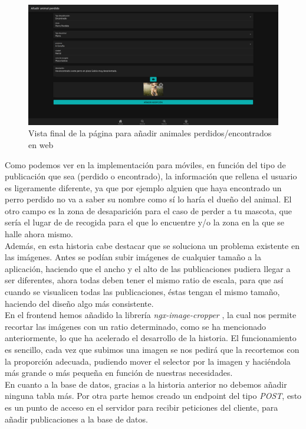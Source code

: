 \begin{figure}[H]
	\centering
	\includegraphics[width=0.8\linewidth]{"sprint 2/hu4/impPerdidosWeb"}
	\caption{Vista final de la página para añadir animales perdidos/encontrados en web}
	\label{fig:impperdidosweb}
\end{figure}

Como podemos ver en la implementación para móviles, en función del tipo de publicación que sea (perdido o encontrado), la información que rellena el usuario es ligeramente diferente, ya que por ejemplo alguien que haya encontrado un perro perdido no va a saber su nombre como sí lo haría el dueño del animal. El otro campo es la zona de desaparición para el caso de perder a tu mascota, que sería el lugar de de recogida para el que lo encuentre y/o la zona en la que se halle ahora mismo. \\

Además, en esta historia cabe destacar que se soluciona un problema existente en las imágenes. Antes se podían subir imágenes de cualquier tamaño a la aplicación, haciendo que el ancho y el alto de las publicaciones pudiera llegar a ser diferentes, ahora todas deben tener el mismo ratio de escala, para que así cuando se visualicen todas las publicaciones, éstas tengan el mismo tamaño, haciendo del diseño algo más consistente.\\

En el frontend hemos añadido la librería \textit{ngx-image-cropper} \cite{cropper}, la cual nos permite recortar las imágenes con un ratio determinado, como se ha mencionado anteriormente, lo que ha acelerado el desarrollo de la historia. El funcionamiento es sencillo, cada vez que subimos una imagen se nos pedirá que la recortemos con la proporción adecuada, pudiendo mover el selector por la imagen y haciéndola más grande o más pequeña en función de nuestras necesidades. \\

En cuanto a la base de datos, gracias a la historia anterior no debemos añadir ninguna tabla más. Por otra parte hemos creado un endpoint del tipo \textit{POST}, esto es un punto de acceso en el servidor para recibir peticiones del cliente, para añadir publicaciones a la base de datos. \\

